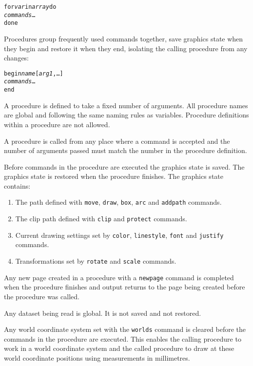 \begin{alltt}
for \textit{var} in \textit{array} do
  \textit{commands} \dots
done
\end{alltt}

Procedures group frequently used commands together, save
graphics state when they begin and restore it when they end,
isolating the calling procedure from any changes:

\begin{alltt}
begin \textit{name} [\textit{arg1}, \dots]
  \textit{commands} \dots
end
\end{alltt}

A procedure is defined to take a fixed number of arguments.
All procedure names are global and following the same naming
rules as variables.
Procedure definitions within a procedure are not allowed.

A procedure is called from any place where a command is accepted
and the number of arguments passed must match the number 
in the procedure definition.

Before commands in the procedure are executed
the graphics state is saved.
\label{graphicsstate}
The graphics state is restored when the procedure finishes.
The graphics state contains:

\begin{enumerate}
\item
The path defined with
\texttt{move},
\texttt{draw},
\texttt{box},
\texttt{arc} and
\texttt{addpath}
commands.

\item
The clip path defined with
\texttt{clip} and
\texttt{protect}
commands.

\item
Current drawing settings set by
\texttt{color},
\texttt{linestyle},
\texttt{font} and \texttt{justify}
commands.

\item
Transformations set by \texttt{rotate} and \texttt{scale} commands.
\end{enumerate}

Any new page created in a procedure with a
\texttt{newpage}
command is completed when the procedure finishes and output
returns to the page being created before the procedure was called.

Any dataset being read is global.  It is not saved and not restored.

Any world coordinate system set with the \texttt{worlds} command is cleared
before the commands in the procedure are executed.  This enables the calling
procedure to work in a world coordinate system and the called procedure to draw
at these world coordinate positions using measurements in millimetres.

